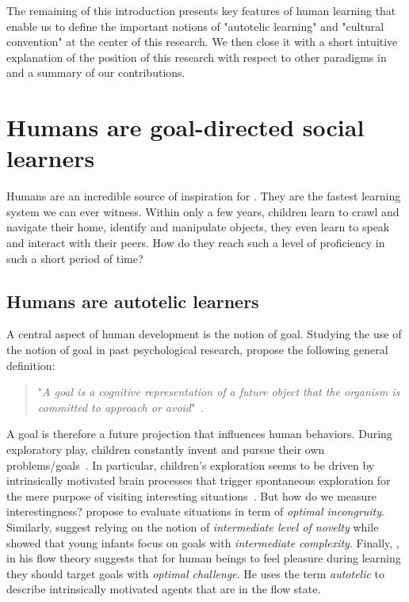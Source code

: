 The remaining of this introduction presents key features of human learning that enable us to define the important notions of "autotelic learning" and "cultural convention" at the center of this research. We then close it with a short intuitive explanation of the position of this research with respect to other paradigms in \ai and a summary of our contributions.


\section{Humans are goal-directed social learners}

Humans are an incredible source of inspiration for \ai. They are the fastest learning system we can ever witness. Within only a few years, children learn to crawl and navigate their home, identify and manipulate objects, they even learn to speak and interact with their peers. How do they reach such a level of proficiency in such a short period of time? 

\subsection{Humans are autotelic learners}

A central aspect of human development is the notion of goal. Studying the use of the notion of goal in past psychological research, \citet{elliot2008goal} propose the following general definition:
\begin{quote}
    "\textit{A goal is a cognitive representation of a future object that the organism is committed to approach or
    avoid}"~\citep{elliot2008goal}.
\end{quote}
%
A goal is therefore a future projection that influences human behaviors. During exploratory play, children constantly invent and pursue their own problems/goals~\citep{chu2020exploratory}. In particular, children's exploration seems to be driven by intrinsically motivated brain processes that trigger spontaneous exploration for the mere purpose of visiting interesting situations~\citep{gopnik1999scientist,kaplan2007search,kidd_psychology_2015}. But how do we measure interestingness?  \citet{hunt1965} propose to evaluate situations in term of \textit{optimal incongruity}. Similarly, \citet{berlyne1966curiosity} suggest relying on the notion of \textit{intermediate level of novelty} while \citet{Kidd2012TheGE} showed that young infants focus on goals with \textit{intermediate complexity}.  Finally, \citet{csikzentmihalyi1997finding}, in his flow theory suggests that for human beings to feel pleasure during learning they should target goals with \textit{optimal challenge}. He uses the term \textit{autotelic} to describe intrinsically motivated agents that are in the flow state. 

